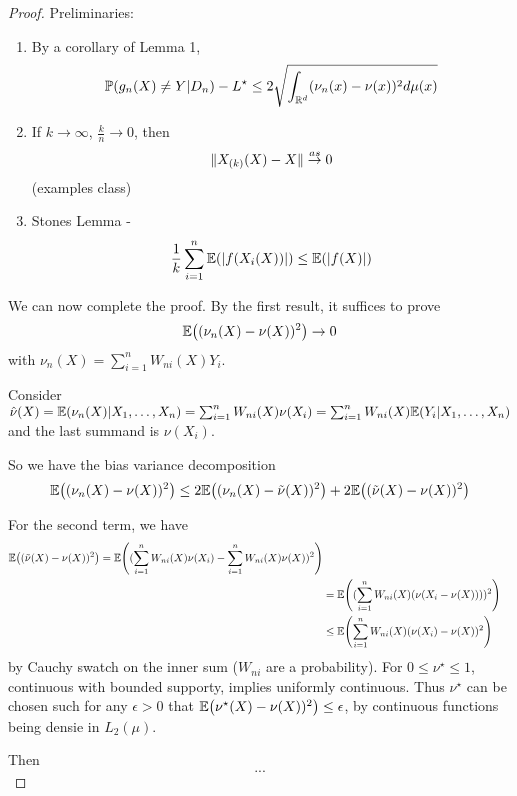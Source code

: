 \begin{proof}
  Preliminaries:
  \begin{enumerate}
  \item By a corollary of Lemma 1,
    \begin{equation}
      \label{eq:98}
      \Prob{g_{n}(X) \neq Y | D_{n}} - L^{\star}\leq 2
      \sqrt{\int_{\R^{d}} (\nu_{n}(x) - \nu(x))^{2} d \mu(x)}
    \end{equation}
  \item If $k \rightarrow \infty$, $\frac{k}{n} \rightarrow 0$, then
    \begin{equation}
      \label{eq:99}
      \| X_{(k)}(X) - X \| \overset{as}{\rightarrow} 0
    \end{equation} (examples class)
  \item Stones Lemma -
    \begin{equation}
      \label{eq:100}
      \frac{1}{k} \sum_{i=1}^{n} \E{|f(X_{i}(X))|} \leq \E{|f(X)|}
    \end{equation}
  \end{enumerate}

  We can now complete the proof.  By the first result, it suffices to
  prove
  \begin{equation}
    \label{eq:101}
    \E{(\nu_{n}(X) - \nu(X))^{2}} \rightarrow 0
  \end{equation} with $\nu_{n}(X) = \sum_{i=1}^{n} W_{ni}(X) Y_{i}$.

  Consider $\hat \nu(X) = \E{\nu_{n}(X) | X_{1}, \dots, X_{n}} =
  \sum_{i=1}^{n} W_{ni}(X) \nu(X_{i}) = \sum_{i=1}^{n} W_{ni}(X)
  \E{Y_{i} | X_{1}, \dots, X_{n}}$ and the last summand is
  $\nu(X_{i})$.

  So we have the bias variance decomposition
  \begin{align}
    \label{eq:102}
    \E{(\nu_{n}(X) - \nu(X))^{2}} \leq 2 \E{(\nu_{n}(X) - \tilde
      \nu(X))^{2}} + 2 \E{(\tilde \nu(X) - \nu(X))^{2}} 
  \end{align}

  For the second term, we have
  \begin{align}
    \label{eq:103}
    \E{(\tilde \nu(X) - \nu(X))^{2}} = \E{(\sum_{i=1}^{n} W_{ni}(X)
      \nu(X_{i}) - \sum_{i=1}^{n} W_{ni}(X) \nu(X))^{2}} \\
    &= \E{(\sum_{i=1}^{n} W_{ni}(X)(\nu(X_{i} - \nu(X))))^{2}} \\
    &\leq \E{\sum_{i=1}^{n} W_{ni}(X) (\nu(X_{i}) - \nu(X))^{2}}
  \end{align} by Cauchy swatch on the inner sum ($W_{ni}$ are a
  probability). For $0 \leq \nu^{\star} \leq 1$, continuous with
  bounded supporty, implies uniformly continuous. Thus $\nu^{\star}$
  can be chosen such for any $\epsilon > 0$ that $\E{\nu^{\star}(X) -
    \nu(X))^{2}} \leq \epsilon$,  by continuous functions being densie
  in $L_{2}(\mu)$.

  Then
  \begin{equation}
    \label{eq:104}
    ...
  \end{equation}
  
\end{proof} 

